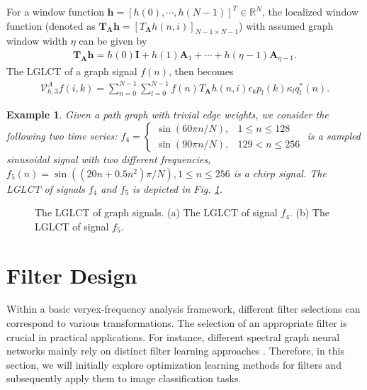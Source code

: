 \documentclass[lettersize,journal]{IEEEtran}
\newtheorem{example}{Example}
\begin{document}
For a window function $\mathbf{h}=[h(0),\cdots,h(N-1)]^T \in \mathbb{R}^N$, the localized window function (denoted as $\mathbf{T}_{\mathbf{A}}\mathbf{h}=\left[T_{\mathbf{A}}h(n,i)\right]_{N-1\times N-1}$) with assumed graph window width $\eta$ can be given by
\begin{align}
	\mathbf{T}_{\mathbf{A}}\mathbf{h}=h(0)\mathbf{I}+h(1)\mathbf{A}_1+\cdots+h(\eta-1)\mathbf{A}_{\eta-1}.
\end{align}
The LGLCT of a graph signal $f(n)$, then becomes
\begin{align}
	\mathcal{V}_{h,3}^Af(i,k)= \sum_{n=0}^{N-1} \sum_{l=0}^{N-1} f(n) T_{\mathbf{A}}h(n,i) \epsilon_k p_l(k) \kappa_l q_l^*(n).
\end{align}

\begin{example}
	Given a path graph with trivial edge weights, we consider
	the following two time series: $f_4=\begin{cases}\sin (60 \pi n / N), & 1 \leq n \leq 128 \\ \sin (90 \pi n / N), & 129<n \leq 256\end{cases}$ is a sampled sinusoidal signal
	with two different frequencies, $f_5(n)=\sin \left(\left(20 n+0.5 n^2\right) \pi / N\right), 1 \leq n \leq 256$ is a chirp signal. 
	The LGLCT of signals $f_4$ and $f_5$ is depicted in Fig. \ref{fig7}.
\end{example}

\begin{figure}
	\centering
	\caption{The LGLCT of graph signals. (a) The LGLCT of signal $f_4$. (b) The LGLCT of signal $f_5$. }\label{fig7}
\end{figure}




\section{Filter Design} \label{sec5}
Within a basic veryex-frequency analysis framework, different filter selections can correspond to various transformations. The selection of an appropriate filter is crucial in practical applications. For instance, different spectral graph neural networks mainly rely on distinct filter learning approaches \cite{chen2020understanding, bo2023survey, wang2022powerful}. Therefore, in this section, we will initially explore optimization learning methods for filters and subsequently apply them to image classification tasks.
\end{document}
